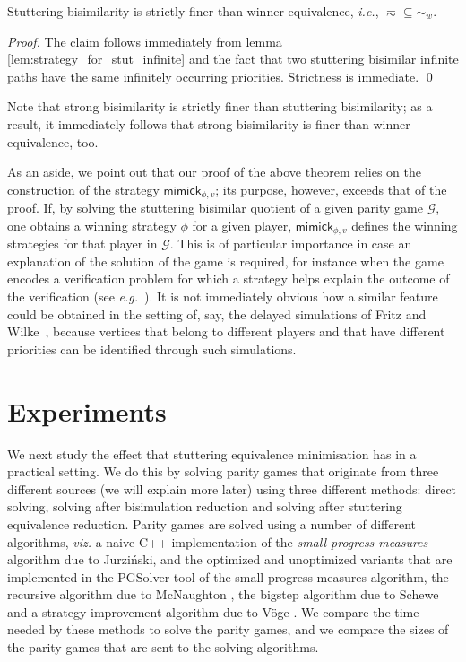 \documentclass[a4paper]{llncs}
\newcommand{\ie}{\textit{i.e.}\xspace}
\newcommand{\eg}{\textit{e.g.}\xspace}
\newcommand{\viz}{\textit{viz.}\xspace}
\newcommand{\game}{\ensuremath{\mathcal{G}}\xspace}
\newcommand{\mimick}{\mathsf{mimick}_{\phi,v}}
\newcommand{\winner}{\ensuremath{\sim_w}}
\newcommand{\stut}{\eqsim}\newcommand{\semistut}{\sim_{\mathrm{semi-st}}}
\begin{document}
\begin{theorem} 
Stuttering bisimilarity is strictly finer than winner equivalence,
\ie, $\stut \subseteq \winner$.
\end{theorem}
\begin{proof}
  The claim follows immediately from lemma \ref{lem:strategy_for_stut_infinite} and the
  fact that two stuttering bisimilar infinite paths have the same infinitely occurring
  priorities. Strictness is immediate. \qed
\end{proof}
Note that strong bisimilarity is strictly finer than stuttering
bisimilarity; as a result, it immediately follows that strong bisimilarity
is finer than winner equivalence, too.

As an aside, we point out that our proof of the above theorem relies
on the construction of the strategy $\mimick{}$; its purpose, however,
exceeds that of the proof. If, by solving the stuttering bisimilar
quotient of a given parity game $\game$, one obtains a winning strategy
$\phi$ for a given player, $\mimick{}$ defines the winning strategies
for that player in $\game$. This is of particular importance in case an
explanation of the solution of the game is required, for instance when the game
encodes a verification problem for which a strategy helps explain the
outcome of the verification (see \eg~\cite{SS:98}). It is not immediately
obvious how a similar feature could be obtained in the setting of, say,
the delayed simulations of Fritz and Wilke~\cite{FW:06}, because vertices
that belong to different players and that have different priorities can be
identified through such simulations.


\section{Experiments}
\label{sec:experiments}

We next study the effect that stuttering equivalence minimisation has in a 
practical setting. We do this by solving parity games that originate from three
different sources (we will explain more later) using three
different methods: direct solving, solving after bisimulation reduction and
solving after stuttering equivalence reduction. Parity games
are solved using a number of different algorithms, \viz a naive C++ implementation of the
\emph{small progress measures} algorithm due to Jurzi{\'n}ski, and the optimized
and unoptimized variants that are implemented in the PGSolver tool \cite{FL:09} 
of the small progress measures algorithm, the recursive algorithm due to 
McNaughton \cite{McN:93}, the bigstep algorithm due to Schewe \cite{Sch:07}
and a strategy improvement algorithm due to V{\"o}ge \cite{VJ:00}.
We compare the time needed by these methods to solve the parity games, and
we compare the sizes of the parity games that are sent to the solving algorithms.
\end{document}
